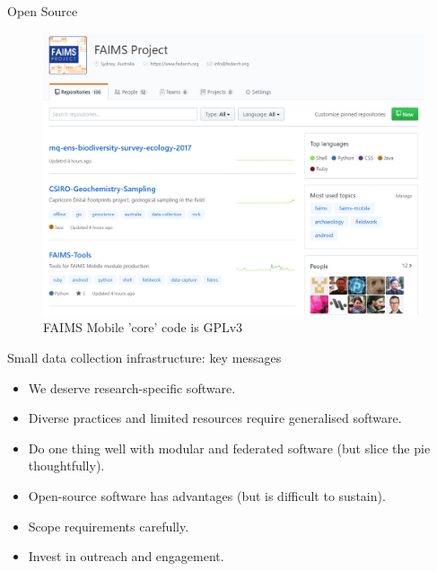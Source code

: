 \documentclass[aspectratio=169, 12pt]{beamer} %
\begin{document}
\begin{frame}{Open Source}
 \begin{figure}[H]
    \centering
        \includegraphics[height=.75\textheight]{figures/FAIMS-generalised.png}
        \caption{FAIMS Mobile 'core' code is GPLv3}
        \label{fig:FAIMS-github-OSS}
 \end{figure}
\end{frame}

\begin{frame}{Small data collection infrastructure: key messages}
    \begin{itemize}[label=\textbullet]
        \item We deserve research-specific software.
        \item Diverse practices and limited resources require generalised software.
        \item Do one thing well with modular and federated software (but slice the pie thoughtfully).
        \item Open-source software has advantages (but is difficult to sustain). 
        \item Scope requirements carefully.
        \item Invest in outreach and engagement.
    \end{itemize}
\end{frame}
\end{document}
